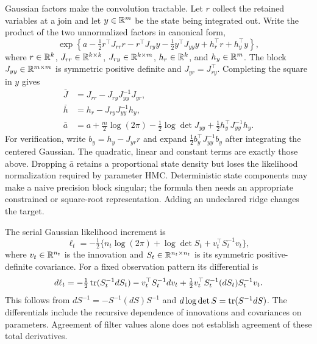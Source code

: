 Gaussian factors make the convolution tractable. Let $r$ collect the retained
variables at a join and let $y\in\mathbb{R}^m$ be the state being integrated out.
Write the product of the two unnormalized factors in canonical form,
\begin{equation}
 \exp\!\left\{a-\tfrac12 r^\top J_{rr}r-r^\top J_{ry}y
       -\tfrac12y^\top J_{yy}y+h_r^\top r+h_y^\top y\right\},
 \label{eq:bf-modern-gaussian-join}
\end{equation}
where $r\in\mathbb{R}^k$, $J_{rr}\in\mathbb{R}^{k\times k}$,
$J_{ry}\in\mathbb{R}^{k\times m}$, $h_r\in\mathbb{R}^k$, and $h_y\in\mathbb{R}^m$.
The block $J_{yy}\in\mathbb{R}^{m\times m}$ is symmetric positive definite and
$J_{yr}=J_{ry}^\top$. Completing
the square in $y$ gives
\begin{align}
 \bar J&=J_{rr}-J_{ry}J_{yy}^{-1}J_{yr},\\
 \bar h&=h_r-J_{ry}J_{yy}^{-1}h_y,\\
 \bar a&=a+\tfrac m2\log(2\pi)-\tfrac12\log\det J_{yy}
                      +\tfrac12h_y^\top J_{yy}^{-1}h_y.
 \label{eq:bf-modern-gaussian-schur}
\end{align}
For verification, write $b_y=h_y-J_{yr}r$ and expand
$\tfrac12 b_y^\top J_{yy}^{-1}b_y$ after integrating the centered Gaussian.
The quadratic, linear and constant terms are exactly those above. Dropping
$\bar a$ retains a proportional state density but loses the likelihood
normalization required by parameter HMC. Deterministic state components may
make a naive precision block singular; the formula then needs an appropriate
constrained or square-root representation. Adding an undeclared ridge changes
the target.

The serial Gaussian likelihood increment is
\begin{equation}
 \ell_t=-\tfrac12\{n_t\log(2\pi)+\log\det S_t+v_t^\top S_t^{-1}v_t\},
 \label{eq:bf-modern-kalman-increment}
\end{equation}
where $v_t\in\mathbb{R}^{n_t}$ is the innovation and
$S_t\in\mathbb{R}^{n_t\times n_t}$ is its symmetric positive-definite covariance.
For a fixed observation pattern its differential is
\begin{equation}
 d\ell_t=-\tfrac12\operatorname{tr}(S_t^{-1}dS_t)
       -v_t^\top S_t^{-1}dv_t
       +\tfrac12v_t^\top S_t^{-1}(dS_t)S_t^{-1}v_t.
 \label{eq:bf-modern-kalman-score-differential}
\end{equation}
This follows from $dS^{-1}=-S^{-1}(dS)S^{-1}$ and
$d\log\det S=\operatorname{tr}(S^{-1}dS)$. The differentials include the recursive
dependence of innovations and covariances on parameters. Agreement of filter
values alone does not establish agreement of these total derivatives.

